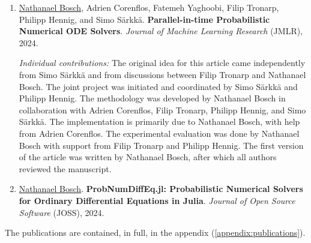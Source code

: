 \documentclass{mimosis}
\begin{document}
\begin{enumerate}[label=\Roman*]
\item
\hypertarget{pint}{
\underline{Nathanael Bosch}, Adrien Corenflos, Fatemeh Yaghoobi, Filip Tronarp, Philipp Hennig, and Simo Särkkä.
\textbf{Parallel-in-time Probabilistic Numerical ODE Solvers}.
\emph{Journal of Machine Learning Research} (JMLR),
2024.
}
\par \emph{Individual contributions:}
The original idea for this article came independently from Simo Särkkä and from discussions between Filip Tronarp and Nathanael Bosch.
The joint project was initiated and coordinated by Simo Särkkä and Philipp Hennig.
The methodology was developed by Nathanael Bosch in collaboration with Adrien Corenflos, Filip Tronarp, Philipp Hennig, and Simo Särkkä.
The implementation is primarily due to Nathanael Bosch, with help from Adrien Corenflos.
The experimental evaluation was done by Nathanael Bosch with support from Filip Tronarp and Philipp Hennig.
The first version of the article was written by Nathanael Bosch, after which all authors reviewed the manuscript.

\item
\hypertarget{joss}{
\underline{Nathanael Bosch}.
\textbf{ProbNumDiffEq.jl: Probabilistic Numerical Solvers for Ordinary Differential Equations in Julia}.
\emph{Journal of Open Source Software} (JOSS),
2024.
}

\end{enumerate}

The publications are contained, in full, in the appendix (\cref{appendix:publications}).
\mainmatter
\end{document}
